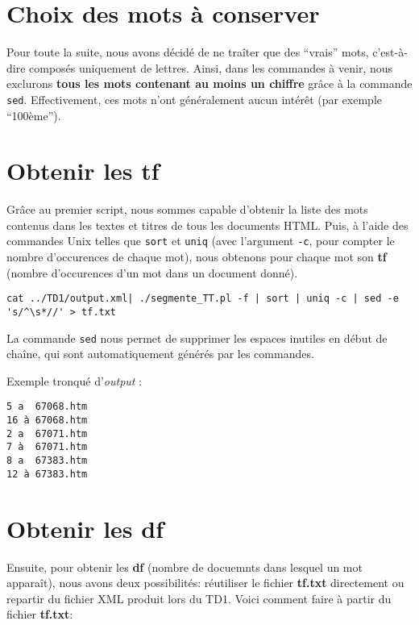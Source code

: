 \section{Choix des mots à conserver}
\fakeshell

Pour toute la suite, nous avons décidé de ne traîter que des ``vrais'' mots, c'est-à-dire composés uniquement de lettres. Ainsi, dans les commandes à venir, nous exclurons \textbf{tous les mots contenant au moins un chiffre} grâce à la commande \lstinline{sed}. Effectivement, ces mots n'ont généralement aucun intérêt (par exemple ``100ème'').

\section{Obtenir les tf}

Grâce au premier script, nous sommes capable d'obtenir la liste des mots contenus dans les textes et titres de tous les documents HTML. Puis, à l'aide des commandes Unix telles que \lstinline{sort} et \lstinline{uniq} (avec l'argument \lstinline{-c}, pour compter le nombre d'occurences de chaque mot), nous obtenons pour chaque mot son \textbf{tf} (nombre d'occurences d'un mot dans un document donné).

\begin{lstlisting}
cat ../TD1/output.xml| ./segmente_TT.pl -f | sort | uniq -c | sed -e 's/^\s*//' > tf.txt
\end{lstlisting}

La commande \lstinline{sed} nous permet de supprimer les espaces inutiles en début de chaîne, qui sont automatiquement générés par les commandes.

\medskip

\noindent Exemple tronqué d'\textit{output} :
\begin{lstlisting}
5 a  67068.htm
16 à 67068.htm
2 a  67071.htm
7 à  67071.htm
8 a  67383.htm
12 à 67383.htm
\end{lstlisting}

\section{Obtenir les df}

Ensuite, pour obtenir les \textbf{df} (nombre de docuemnts dans lesquel un mot apparaît), nous avons deux possibilités: réutiliser le fichier \textbf{tf.txt} directement ou repartir du fichier XML produit lors du TD1. Voici comment faire à partir du fichier \textbf{tf.txt}:

